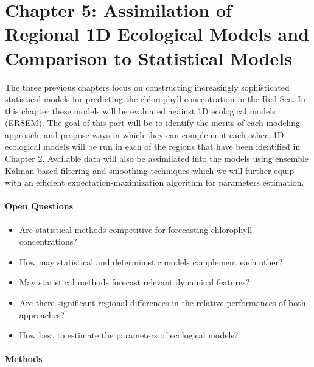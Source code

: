 \section{Chapter 5: Assimilation of Regional 1D Ecological Models and
Comparison to Statistical Models}

The three previous chapters focus on constructing increasingly sophisticated
statistical models for predicting the chlorophyll concentration in the Red Sea.
In this chapter these models will be evaluated against 1D ecological models
(ERSEM). The goal of this part will be to identify the merits of each modeling
approach, and propose ways in which they can complement each other. 1D
ecological models will be run in each of the regions that have been identified
in Chapter 2.  Available data will also be assimilated into the models using
ensemble Kalman-based filtering and smoothing techniques which we will further
equip with an efficient expectation-maximization algorithm for parameters
estimation.

\paragraph{Open Questions}

\begin{itemize}

\item Are statistical methods competitive for forecasting chlorophyll
concentrations?

\item How may statistical and deterministic models complement each other?

\item May statistical methods forecast relevant dynamical features?

\item Are there significant regional differences in the relative performances
of both approaches?

\item How best to estimate the parameters of ecological models? 

\end{itemize}

\paragraph{Methods}


